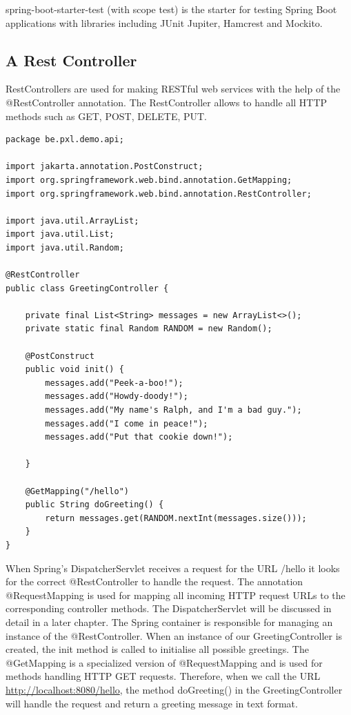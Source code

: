 \documentclass[a4paper, 12pt]{report}
\begin{document}
spring-boot-starter-test (with scope test) is the starter for testing Spring Boot applications with libraries including JUnit Jupiter, Hamcrest and Mockito.

\subsection{A Rest Controller}

RestControllers are used for making RESTful web services with the help of the @RestController annotation. The RestController allows to handle all HTTP methods such as GET, POST, DELETE, PUT. 

\begin{lstlisting}[frame=single]
package be.pxl.demo.api;

import jakarta.annotation.PostConstruct;
import org.springframework.web.bind.annotation.GetMapping;
import org.springframework.web.bind.annotation.RestController;

import java.util.ArrayList;
import java.util.List;
import java.util.Random;

@RestController
public class GreetingController {

    private final List<String> messages = new ArrayList<>();
    private static final Random RANDOM = new Random();

    @PostConstruct
    public void init() {
        messages.add("Peek-a-boo!");
        messages.add("Howdy-doody!");
        messages.add("My name's Ralph, and I'm a bad guy.");
        messages.add("I come in peace!");
        messages.add("Put that cookie down!");

    }

    @GetMapping("/hello")
    public String doGreeting() {
        return messages.get(RANDOM.nextInt(messages.size()));
    }
}
\end{lstlisting}

When Spring's DispatcherServlet receives a request for the URL /hello it looks for the correct @RestController to handle the request. The annotation @RequestMapping is used for mapping all incoming HTTP request URLs to the corresponding controller methods. The DispatcherServlet will be discussed in detail in a later chapter. The Spring container is responsible for managing an instance of the @RestController. When an instance of our GreetingController is created,  the init method is called to initialise all possible greetings.  The @GetMapping is a specialized version of @RequestMapping and is used for methods handling HTTP  GET requests.  Therefore, when we call the URL \url{http://localhost:8080/hello}, the method doGreeting() in the GreetingController will handle the request and return a greeting message in text format.
\end{document}
